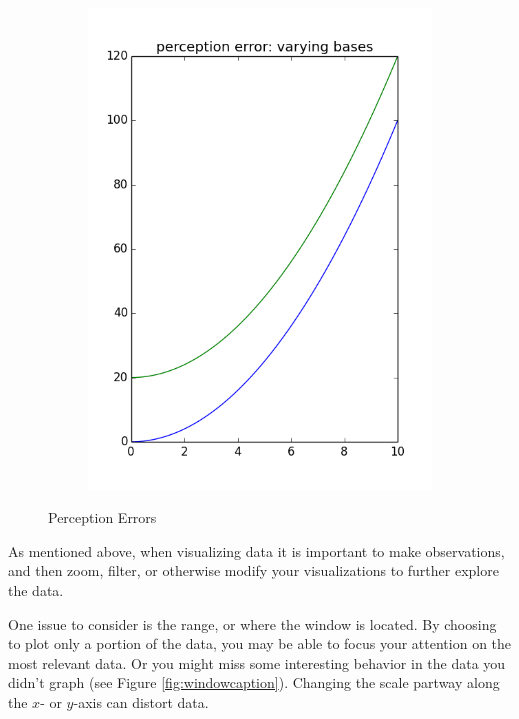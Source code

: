 \begin{figure}[h]
\begin{subfigure}{.4\textwidth}
\includegraphics[width=\textwidth]{PE_varying_bases.png}
\end{subfigure}
\caption{Perception Errors}
\label{fig:perceptionerror}
\end{figure}


As mentioned above, when visualizing data it is important to make observations, and then zoom, filter, or otherwise modify your visualizations to further explore the data. 

One issue to consider is the range, or where the window is located. By choosing to plot only a portion of the data, you may be able to focus your attention on the most relevant data. Or you might miss some interesting behavior in the data you didn't graph (see Figure \ref{fig:windowcaption}).
Changing the scale partway along the $x$- or $y$-axis can distort data.

